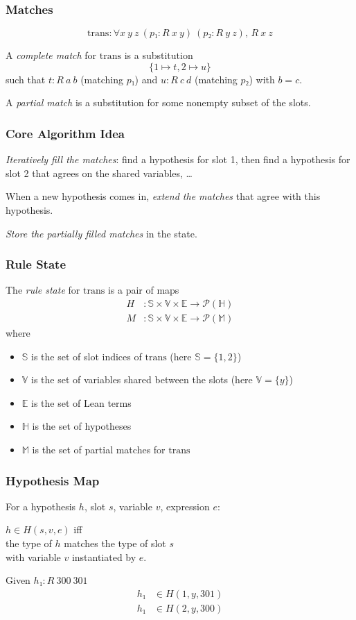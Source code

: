 \documentclass[xetex]{beamer}
\newcommand{\Expr}{\ensuremath{\mathbb{E}}}
\newcommand{\Hyps}{\ensuremath{\mathbb{H}}}
\newcommand{\Matches}{\ensuremath{\mathbb{M}}}
\newcommand{\Slots}{\ensuremath{\mathbb{S}}}
\newcommand{\Vars}{\ensuremath{\mathbb{V}}}
\newcommand{\Pow}[1]{\ensuremath{\mathcal{P}(#1)}}
\begin{document}
\begin{frame}
  \frametitle{Matches}

  \[
    \mathrm{trans} : ∀ x~y~z~(p₁ : R~x~y)~(p₂ : R~y~z),\, R~x~z
  \]

  A \emph{complete match} for $\mathrm{trans}$ is a substitution
  \[
    \{1 ↦ t, 2 ↦ u\}
  \]
  such that $t : R~a~b$ (matching $p₁$) and $u : R~c~d$ (matching $p₂$) with $b = c$.

  A \emph{partial match} is a substitution for some nonempty subset of the slots.
\end{frame}

\begin{frame}
  \frametitle{Core Algorithm Idea}

  \emph{Iteratively fill the matches}: find a hypothesis for slot 1, then find a hypothesis for slot 2 that agrees on the shared variables, \dots

  When a new hypothesis comes in, \emph{extend the matches} that agree with this hypothesis.

  \emph{Store the partially filled matches} in the state.
\end{frame}

\begin{frame}
  \frametitle{Rule State}

  The \emph{rule state} for $\mathrm{trans}$ is a pair of maps
  \begin{align*}
    H &: \Slots × \Vars × \Expr → \Pow{\Hyps} \\
    M &: \Slots × \Vars × \Expr → \Pow{\Matches}
  \end{align*}
  where
  \begin{itemize}
    \item \Slots{} is the set of slot indices of $\mathrm{trans}$ (here $\Slots = \{1,2\}$)
    \item \Vars{} is the set of variables shared between the slots (here $\Vars = \{y\}$)
    \item \Expr{} is the set of Lean terms
    \item \Hyps{} is the set of hypotheses
    \item \Matches{} is the set of partial matches for $\mathrm{trans}$
  \end{itemize}
\end{frame}

\begin{frame}
  \frametitle{Hypothesis Map}

  For a hypothesis $h$, slot $s$, variable $v$, expression $e$:

  $h ∈ H(s, v, e)$ iff \\
  the type of $h$ matches the type of slot $s$ \\
  with variable $v$ instantiated by $e$.

  \begin{example}
    Given $h₁ : R~300~301$
    \begin{align*}
      h₁ &∈ H(1, y, 301) \\
      h₁ &∈ H(2, y, 300) \\
    \end{align*}
  \end{example}
\end{frame}
\end{document}
